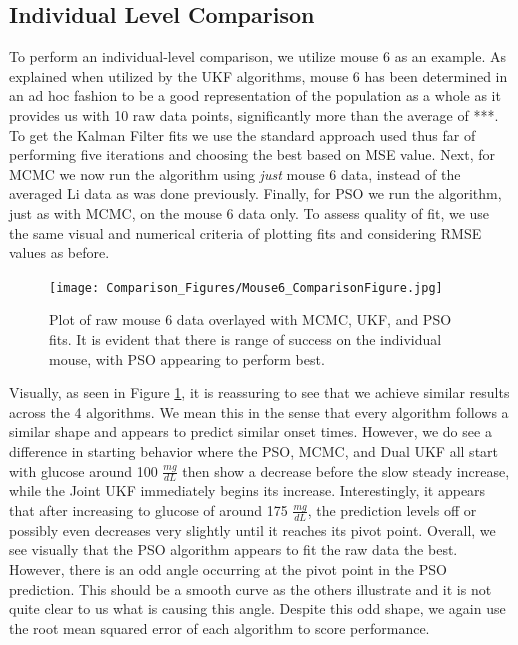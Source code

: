 \documentclass{article}
\begin{document}
\subsection{Individual Level Comparison}
To perform an individual-level comparison, we utilize mouse 6 as an example. As explained when utilized by the UKF algorithms, mouse 6 has been determined in an ad hoc fashion to be a good representation of the population as a whole as it provides us with 10 raw data points, significantly more than the average of ***. To get the Kalman Filter fits we use the standard approach used thus far of performing five iterations and choosing the best based on MSE value. Next, for MCMC we now run the algorithm using \emph{just} mouse 6 data, instead of the averaged Li data as was done previously. Finally, for PSO we run the algorithm, just as with MCMC, on the mouse 6 data only. To assess quality of fit, we use the same visual and numerical criteria of plotting fits and considering RMSE values as before. 
\begin{figure}[H]
    \centering
    \texttt{[image: Comparison\_Figures/Mouse6\_ComparisonFigure.jpg]}
    \caption{Plot of raw mouse 6 data overlayed with MCMC, UKF, and PSO fits. It is evident that there is range of success on the individual mouse, with PSO appearing to perform best.}
    \label{fig:Results_Mouse6_Comparison}
\end{figure}
Visually, as seen in Figure \ref{fig:Results_Mouse6_Comparison}, it is reassuring to see that we achieve similar results across the 4 algorithms. We mean this in the sense that every algorithm follows a similar shape and appears to predict similar onset times. However, we do see a difference in starting behavior where the PSO, MCMC, and Dual UKF all start with glucose around 100 $\frac{mg}{dL}$ then show a decrease before the slow steady increase, while the Joint UKF immediately begins its increase. Interestingly, it appears that after increasing to glucose of around 175 $\frac{mg}{dL}$, the prediction levels off or possibly even decreases very slightly until it reaches its pivot point. Overall, we see visually that the PSO algorithm appears to fit the raw data the best. However, there is an odd angle occurring at the pivot point in the PSO prediction. This should be a smooth curve as the others illustrate and it is not quite clear to us what is causing this angle. Despite this odd shape, we again use the root mean squared error of each algorithm to score performance.
\end{document}
